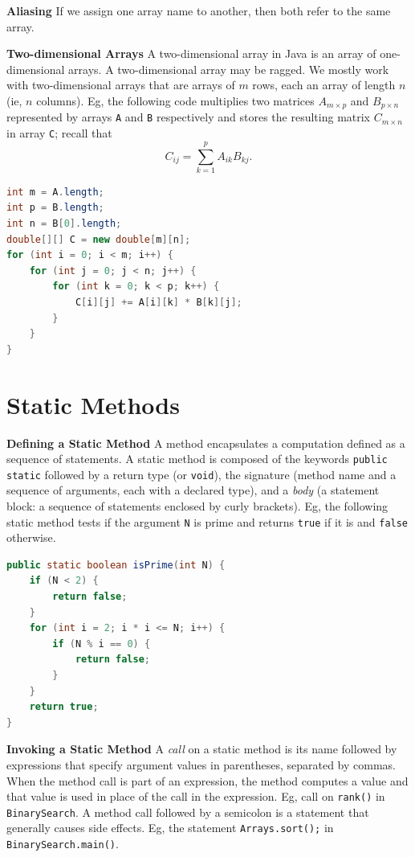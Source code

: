 \documentclass[8pt,a4paper,compress]{beamer}
\begin{document}
\begin{frame}[fragile]
\pause

\textbf{Aliasing} If we assign one array name to another, then both refer to the same array.

\pause
\smallskip

\textbf{Two-dimensional Arrays} A two-dimensional array in Java is an array of one-dimensional arrays. A two-dimensional array may be ragged. We mostly work with two-dimensional arrays that are arrays of $m$ rows, each an array of length $n$ (ie, $n$ columns). Eg, the following code multiplies two matrices $A_{m\times p}$ and $B_{p\times n}$ represented by arrays \lstinline$A$ and \lstinline$B$ respectively and stores the resulting matrix $C_{m\times n}$ in array \lstinline$C$; recall that $$C_{ij}=\sum_{k=1}^{p} A_{ik}B_{kj}.$$
\begin{lstlisting}[language=Java]
int m = A.length;
int p = B.length;
int n = B[0].length;
double[][] C = new double[m][n];
for (int i = 0; i < m; i++) {
    for (int j = 0; j < n; j++) {
        for (int k = 0; k < p; k++) {
            C[i][j] += A[i][k] * B[k][j];
        }
    }
}
\end{lstlisting}

\end{frame}

\section{Static Methods}
\begin{frame}[fragile]
\pause

\textbf{Defining a Static Method} A method encapsulates a computation defined as a sequence of statements. A static method is composed of the keywords \lstinline$public static$ followed by a return type (or \lstinline$void$), the signature (method name and a sequence of arguments, each with a declared type), and a \emph{body} (a statement block: a sequence of statements enclosed by curly brackets). Eg, the following static method tests if the argument \lstinline$N$ is prime and returns \lstinline$true$ if it is and \lstinline$false$ otherwise.

\begin{lstlisting}[language=Java]
public static boolean isPrime(int N) {
    if (N < 2) {
        return false;
    }
    for (int i = 2; i * i <= N; i++) {
        if (N % i == 0) {
            return false;
        }
    }
    return true;
}
\end{lstlisting}

\pause
\smallskip

\textbf{Invoking a Static Method} A \emph{call} on a static method is its name followed by expressions that specify argument values in parentheses, separated by commas. When the method call is part of an expression, the method computes a value and that value is used in place of the call in the expression. Eg, call on \lstinline$rank()$ in \lstinline$BinarySearch$. A method call followed by a semicolon is a statement that generally causes side effects. Eg, the statement \lstinline$Arrays.sort();$ in \lstinline$BinarySearch.main()$.

\end{frame}
\end{document}
